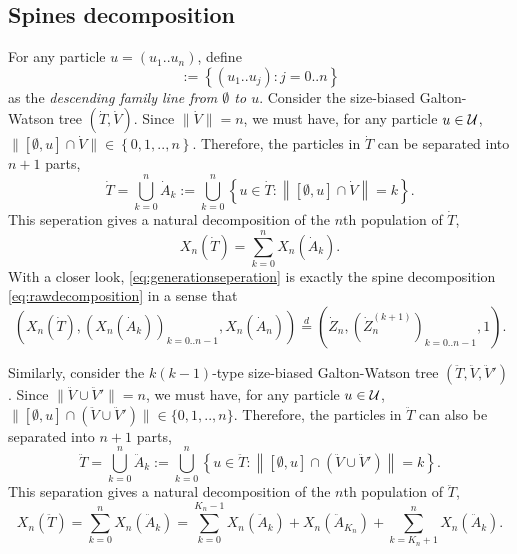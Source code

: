 \documentclass[12pt]{amsart}
\theoremstyle{remark}
\numberwithin{equation}{section}
\newcommand{\defn}[1]{{\em #1}}
\newcommand{\norm}[1]{\left\| #1 \right\|}
\newcommand{\expr}[1]{\left( #1 \right)}
\newcommand{\set}[1]{\left\{ #1 \right\}}
\newcommand{\ancestor}[1]{[\emptyset,#1]}
\newcommand{\eqlaw}{\overset{d}{=}}
\begin{document}
\subsection{Spines decomposition}
\label{sec:spinesdecomposition}
	For any particle $u=(u_1..u_n)$, define 
\begin{equation*}
	    \ancestor{u}
	:=
	    \set{(u_1..u_j):j=0..n}
\end{equation*}
    as the \defn{descending family line from $\emptyset$ to $u$}. Consider the size-biased Galton-Watson tree $(\dot T,\dot V)$. Since $\|\dot V\|=n$, we must have, for any particle $u\in\mathcal U$, $\|\ancestor{u}\cap\dot V\|\in\set{0,1,..,n}$. Therefore, the particles in $\dot T$ can be separated into $n+1$ parts, 
\begin{equation*}
		\dot T
	=
		\bigcup_{k=0}^n\dot A_k
	:=
	    \bigcup_{k=0}^n\set{u\in\dot T:\norm{\ancestor{u}\cap \dot V}=k}.
\end{equation*}
	This seperation gives a natural decomposition of the $n$th population of $\dot T$,
\begin{equation}
\label{eq:generationseperation}
		X_n(\dot T)
	=
		\sum_{k=0}^nX_n(\dot A_k).
\end{equation}
	With a closer look, \eqref{eq:generationseperation} is exactly the spine decomposition \eqref{eq:rawdecomposition} in a sense that
\begin{equation*}
        \expr{X_n(\dot T),\expr{X_n(\dot A_k)}_{k=0..n-1},X_n(\dot A_n)}
    \eqlaw
        \expr{\dot Z_n,\expr{\dot Z_n^{(k+1)}}_{k=0..n-1},1}.
\end{equation*}
\par
	Similarly, consider the $k(k-1)$-type size-biased Galton-Watson tree $(\ddot T,\ddot V,\ddot V')$. Since $\|\ddot V\cup\ddot V'\|=n$, we must have, for any particle $u\in\mathcal U$, $\|\ancestor{u}\cap(\ddot V\cup \ddot V')\|\in\{0,1,..,n\}$. Therefore, the particles in $\ddot T$ can also be separated into $n+1$ parts,
\begin{equation*}
		\ddot T
	=
		\bigcup_{k=0}^n \ddot A_k
	:=
		\bigcup_{k=0}^n\set{u\in\ddot T:\norm{\ancestor{u}\cap\expr{\ddot V\cup\ddot V'}}=k}.
\end{equation*}  
    This separation gives a natural decomposition of the $n$th population of $\ddot T$,
\begin{equation}
\label{eq:rawtwospinedecomposition}
		X_n(\ddot T)
	=
		\sum_{k=0}^nX_n(\ddot A_k)
	=
	    \sum_{k=0}^{K_n-1}X_n(\ddot A_k)
	+
		X_n(\ddot A_{K_n})
	+
		\sum_{k=K_n+1}^nX_n(\ddot A_k).
\end{equation}
\end{document}
